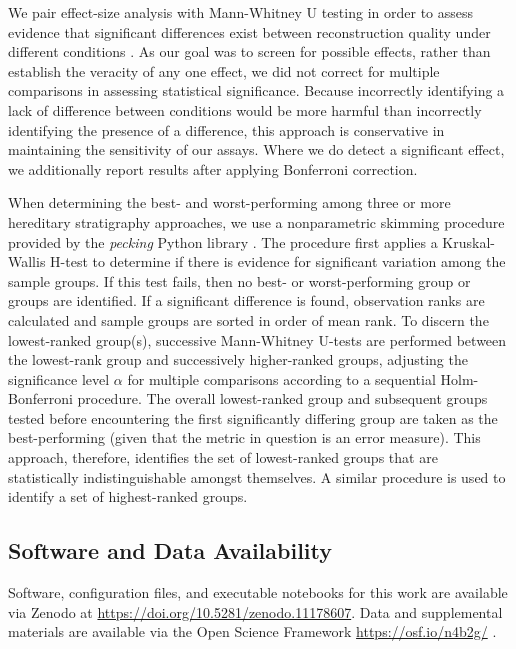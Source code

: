 We pair effect-size analysis with Mann-Whitney U testing in order to assess evidence that significant differences exist between reconstruction quality under different conditions \citep{mann1947on}.
As our goal was to screen for possible effects, rather than establish the veracity of any one effect, we did not correct for multiple comparisons in assessing statistical significance.
Because incorrectly identifying a lack of difference between conditions would be more harmful than incorrectly identifying the presence of a difference, this approach is conservative in maintaining the sensitivity of our assays.
Where we do detect a significant effect, we additionally report results after applying Bonferroni correction.

When determining the best- and worst-performing among three or more hereditary stratigraphy approaches, we use a nonparametric skimming procedure provided by the \textit{pecking} Python library \citep{moreno2024pecking}.
The procedure first applies a Kruskal-Wallis H-test to determine if there is evidence for significant variation among the sample groups.
If this test fails, then no best- or worst-performing group or groups are identified.
If a significant difference is found, observation ranks are calculated and sample groups are sorted in order of mean rank.
To discern the lowest-ranked group(s), successive Mann-Whitney U-tests are performed between the lowest-rank group and successively higher-ranked groups, adjusting the significance level $\alpha$ for multiple comparisons according to a sequential Holm-Bonferroni procedure.
The overall lowest-ranked group and subsequent groups tested before encountering the first significantly differing group are taken as the best-performing (given that the metric in question is an error measure).
This approach, therefore, identifies the set of lowest-ranked groups that are statistically indistinguishable amongst themselves.
A similar procedure is used to identify a set of highest-ranked groups.

\subsection{Software and Data Availability}

Software, configuration files, and executable notebooks for this work are available via Zenodo at \url{https://doi.org/10.5281/zenodo.11178607}.
Data and supplemental materials are available via the Open Science Framework \url{https://osf.io/n4b2g/} \citep{foster2017open}.

